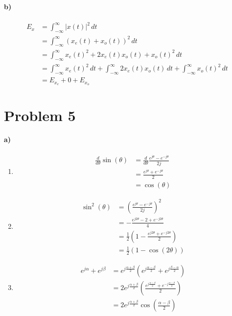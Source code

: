\documentclass[12pt]{article}
\begin{document}
\paragraph{b)}

\begin{align*}
	E_x&=\int_{-\infty}^\infty \left|x(t)\right|^2\,dt\\
	&=\int_{-\infty}^\infty \left(x_e(t)+x_o(t)\right)^2\,dt\\
	&=\int_{-\infty}^\infty x_e(t)^2+2x_e(t)x_o(t)+x_o(t)^2\,dt\\
	&=\int_{-\infty}^\infty x_e(t)^2\,dt + \int_{-\infty}^\infty 2x_e(t)x_o(t)\,dt + \int_{-\infty}^\infty x_o(t)^2\,dt\\
	&=E_{x_e}+0+E_{x_o}
\end{align*}

\pagebreak

\section*{Problem 5}

\paragraph{a)}

\begin{enumerate}
	\item
	\begin{align*}
		\frac{d}{d\theta} \sin(\theta) &= \frac{d}{d\theta} \frac{e^{j\theta}-e^{-j\theta}}{2j} \\
		&=\frac{e^{j\theta}+e^{-j\theta}}{2}\\
		&=\cos(\theta)
	\end{align*}
	\item
	\begin{align*}
		\sin^2(\theta) &=\left(\frac{e^{j\theta}-e^{-j\theta}}{2j}\right)^2 \\
		&=-\frac{e^{j2\theta}-2+e^{-j2\theta}}{4}\\
		&=\frac{1}{2}\left(1-\frac{e^{j2\theta}+e^{-j2\theta}}{2}\right)\\
		&=\frac{1}{2}(1-\cos(2\theta))
	\end{align*}
	\item
	\begin{align*}
		e^{j\alpha}+e^{j\beta} &=e^{j\frac{\alpha+\beta}{2}}\left(e^{j\frac{\alpha-\beta}{2}}+e^{j\frac{\beta-\alpha}{2}}\right) \\
		&=2e^{j\frac{\alpha+\beta}{2}}\left(\frac{e^{j\frac{\alpha-\beta}{2}}+e^{-j\frac{\alpha-\beta}{2}}}{2}\right)\\
		&=2e^{j\frac{\alpha+\beta}{2}}\cos\left(\frac{\alpha-\beta}{2}\right)
	\end{align*}
\end{enumerate}
\end{document}

